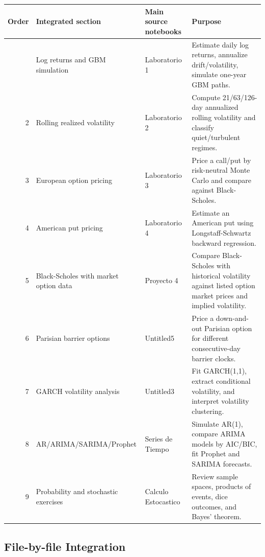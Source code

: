 \documentclass[
  11pt,
]{article}
\begin{document}
\begin{longtable}[]{@{}rlll@{}}
\toprule\noalign{}
Order & Integrated section & Main source notebooks & Purpose \\
\midrule\noalign{}
\endhead
\bottomrule\noalign{}
\endlastfoot
1 & Log returns and GBM simulation & Laboratorio 1 & Estimate daily log returns, annualize drift/volatility, simulate one-year GBM paths. \\
2 & Rolling realized volatility & Laboratorio 2 & Compute 21/63/126-day annualized rolling volatility and classify quiet/turbulent regimes. \\
3 & European option pricing & Laboratorio 3 & Price a call/put by risk-neutral Monte Carlo and compare against Black-Scholes. \\
4 & American put pricing & Laboratorio 4 & Estimate an American put using Longstaff-Schwartz backward regression. \\
5 & Black-Scholes with market option data & Proyecto 4 & Compare Black-Scholes with historical volatility against listed option market prices and implied volatility. \\
6 & Parisian barrier options & Untitled5 & Price a down-and-out Parisian option for different consecutive-day barrier clocks. \\
7 & GARCH volatility analysis & Untitled3 & Fit GARCH(1,1), extract conditional volatility, and interpret volatility clustering. \\
8 & AR/ARIMA/SARIMA/Prophet & Series de Tiempo & Simulate AR(1), compare ARIMA models by AIC/BIC, fit Prophet and SARIMA forecasts. \\
9 & Probability and stochastic exercises & Calculo Estocastico & Review sample spaces, products of events, dice outcomes, and Bayes' theorem. \\
\end{longtable}

\subsection{File-by-file Integration}\label{file-by-file-integration}
\end{document}

